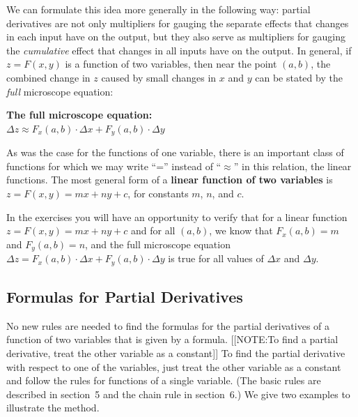 	We can formulate this idea more generally in the following way: partial derivatives are not only multipliers for gauging the separate effects that changes in each input have on the output, but they also serve as multipliers for gauging the {\em cumulative\/} effect that changes in all inputs have on the output.  In general, if $z=F(x,y)$ is a function of two variables, then near the point $(a,b)$, the combined change in $z$ caused by small changes in $x$ and $y$ can be stated by the {\em full\/} microscope equation:
\begin{observation}

{\bf The full microscope equation:} \\

{\bf \boldmath $\Delta z \approx F_x(a,b) \cdot \Delta x +
F_y(a,b) \cdot \Delta y$}
\end{observation}


As was the case for the functions of one variable, there is an
important class of functions for which we may write ``='' instead of
``$\approx$'' in this relation, the linear functions.  The most
general form of a {\bf linear function of two variables} is $z=F(x,y)= mx + ny + c$, for constants $m$, $n$, and
$c$.

In the exercises you will have an opportunity to verify that for a
linear function $z = F(x,y) = mx + ny + c$ and for all $(a,b)$, we
know that $F_x(a,b) = m$ and $F_y(a,b) = n$, and the full microscope
equation $\Delta z = F_x(a,b) \cdot \Delta x + F_y(a,b) \cdot \Delta
y$ is true for all values of $\Delta x$ and $\Delta y$.


\subsection{Formulas for Partial Derivatives}
\label{subsec:formulas-for-partial-derivatives}

No new rules are needed to find the formulas for the partial
derivatives of a function of two variables that is given by a formula.
[[NOTE:To find a partial derivative, treat the other variable as a constant]]
To find the partial derivative with respect to one of the variables,
just treat the other variable as a constant and follow the rules for
functions of a single variable.  (The basic rules are described in
section~5 and the chain rule in section~6.)  We give two examples to
illustrate the method.


